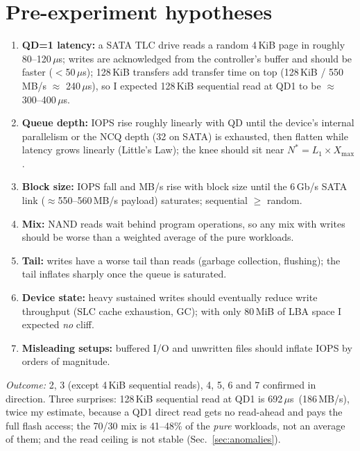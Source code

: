 ﻿\documentclass[10.5pt]{article}
\newcommand{\us}{\,$\mu$s}
\begin{document}
\section{Pre-experiment hypotheses}
\begin{enumerate}
  \item \textbf{QD=1 latency:} a SATA TLC drive reads a random 4\,KiB page in roughly 80--120\us; writes are acknowledged from the controller's buffer and should be faster ($<$50\us); 128\,KiB transfers add transfer time on top (128\,KiB / 550\,MB/s $\approx$ 240\us), so I expected 128\,KiB sequential read at QD1 to be $\approx$ 300--400\us.
  \item \textbf{Queue depth:} IOPS rise roughly linearly with QD until the device's internal parallelism or the NCQ depth (32 on SATA) is exhausted, then flatten while latency grows linearly (Little's Law); the knee should sit near $N^{*}=L_{1}\times X_{\max}$.
  \item \textbf{Block size:} IOPS fall and MB/s rise with block size until the 6\,Gb/s SATA link ($\approx$550--560\,MB/s payload) saturates; sequential $\ge$ random.
  \item \textbf{Mix:} NAND reads wait behind program operations, so any mix with writes should be worse than a weighted average of the pure workloads.
  \item \textbf{Tail:} writes have a worse tail than reads (garbage collection, flushing); the tail inflates sharply once the queue is saturated.
  \item \textbf{Device state:} heavy sustained writes should eventually reduce write throughput (SLC cache exhaustion, GC); with only 80\,MiB of LBA space I expected \emph{no} cliff.
  \item \textbf{Misleading setups:} buffered I/O and unwritten files should inflate IOPS by orders of magnitude.
\end{enumerate}
\emph{Outcome:} 2, 3 (except 4\,KiB sequential reads), 4, 5, 6 and 7 confirmed in direction. Three surprises: 128\,KiB sequential read at QD1 is 692\us\ (186\,MB/s), twice my estimate, because a QD1 direct read gets no read-ahead and pays the full flash access; the 70/30 mix is 41--48\% of the \emph{pure} workloads, not an average of them; and the read ceiling is not stable (Sec.~\ref{sec:anomalies}).
\end{document}
